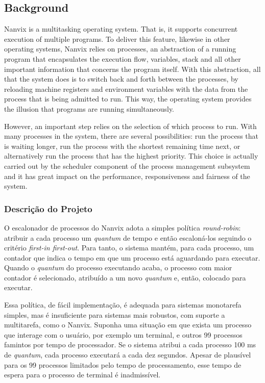 \documentclass[11pt]{article}
\newif\ifbr
\begin{document}
	\subsection*{Background}

	Nanvix is a multitasking operating system. That is, it supports
	concurrent execution of multiple programs. To deliver this feature,
	likewise in other operating systems, Nanvix relies on processes, an
	abstraction of a running program that encapsulates the execution
	flow, variables, stack and all other important information that
	concerns the program itself. With this abstraction, all that the
	system does is to switch back and forth between the processes, by
	reloading machine registers and environment variables with the data from
	the process that is being admitted to run. This way, the
	operating system provides the illusion that programs are running
	simultaneously.

	 However, an important step relies on the selection of which process
	 to run. With many processes in the system, there are several
	 possibilities: run the process that is waiting longer, run the
	 process with the shortest remaining time next, or alternatively run
	 the process that has the highest priority. This choice is actually
	 carried out by the scheduler component of the process management
	 subsystem and it has great impact on the performance,
	 responsiveness and fairness of the system.
\fi

\ifbr
	\subsubsection*{Descrição do Projeto}

		O escalonador de processos do Nanvix adota a simples política
		\textit{round-robin}: atribuir a cada processo um \textit{quantum}
		de tempo e então escaloná-los seguindo o critério \textit{first-in
		first-out}. Para tanto, o sistema mantém, para cada processo, um
		contador que indica o tempo em que um processo está aguardando para
		executar. Quando o \textit{quantum} do processo executando acaba, o
		processo com maior contador é selecionado, atribuído a um novo
		\textit{quantum} e, então, colocado para executar.

		Essa política, de fácil implementação, é adequada para sistemas
		monotarefa simples, mas é insuficiente para sistemas mais robustos,
		com suporte a multitarefa, como o Nanvix. Suponha uma situação em
		que exista um processo que interage com o usuário, por exemplo um
		terminal, e outros 99 processos famintos por tempo de processador.
		Se o sistema atribui a cada processo 100 ms de \textit{quantum},
		cada processo executará a cada dez segundos. Apesar de plausível
		para os 99 processos limitados pelo tempo de processamento, esse
		tempo de espera para o processo de terminal é inadmissível.
\end{document}
